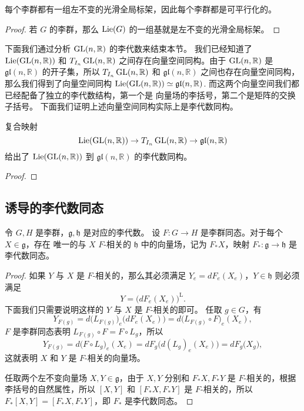 \begin{corollary}
  每个李群都有一组左不变的光滑全局标架，因此每个李群都是可平行化的。
\end{corollary}
\begin{proof}
  若 $G$ 的李群，那么 $\operatorname{Lie}(G)$ 的一组基就是左不变的光滑全局标架。
\end{proof}

下面我们通过分析 $\operatorname{GL}(n,\mathbb{R})$ 的李代数来结束本节。
我们已经知道了 $\operatorname{Lie}(\operatorname{GL}(n,\mathbb{R}))$ 和 $T_{I_n}\operatorname{GL}(n,\mathbb{R})$
之间存在向量空间同构。由于 $\operatorname{GL}(n,\mathbb{R})$ 是 $\mathfrak{gl}(n,\mathbb{R})$
的开子集，所以 $T_{I_n}\operatorname{GL}(n,\mathbb{R})$ 和 $\mathfrak{gl}(n,\mathbb{R})$
之间也存在向量空间同构，那么我们得到了向量空间同构
$\operatorname{Lie}(\operatorname{GL}(n,\mathbb{R}))\simeq \mathfrak{gl}(n,\mathbb{R})$.
而这两个向量空间我们都已经配备了独立的李代数结构，第一个是
向量场的李括号，第二个是矩阵的交换子括号。
下面我们证明上述向量空间同构实际上是李代数同构。

\begin{proposition}[一般线性群的李代数]
  复合映射
  \[
    \operatorname{Lie}(\operatorname{GL}(n,\mathbb{R}))\to T_{I_n}\operatorname{GL}(n,\mathbb{R})
    \to \mathfrak{gl}(n,\mathbb{R})  
  \]
  给出了 $\operatorname{Lie}(\operatorname{GL}(n,\mathbb{R}))$ 到 $\mathfrak{gl}(n,\mathbb{R})$
  的李代数同构。
\end{proposition}
\begin{proof}
  
\end{proof}

\subsection{诱导的李代数同态}

\begin{theorem}[李群同态诱导李代数同态]
  令 $G,H$ 是李群，$\mathfrak{g},\mathfrak{h}$ 是对应的李代数。
  设 $F:G\to H$ 是李群同态。对于每个 $X\in \mathfrak{g}$，存在
  唯一的与 $X$ $F$-相关的 $\mathfrak{h}$ 中的向量场，记为
  $F_*X$，映射 $F_*:\mathfrak{g}\to \mathfrak{h}$ 是李代数同态。
\end{theorem}
\begin{proof}
  如果 $Y$ 与 $X$ 是 $F$-相关的，那么其必须满足
  $Y_e=dF_e(X_e)$，$Y\in \mathfrak{h}$ 则必须满足
  \[
    Y=  \bigl(dF_e(X_e)\bigr)^{\mathrm{L}}.
  \]
  下面我们只需要说明这样的 $Y$ 与 $X$ 是 $F$-相关的即可。
  任取 $g\in G$，有
  \[
    Y_{F(g)}=d\bigl(L_{F(g)}\bigr)_{e}\bigl(dF_e(X_e)\bigr)=d\bigl(L_{F(g)}\circ F\bigr)_e
    (X_e),
  \]
  $F$ 是李群同态表明 $L_{F(g)}\circ F=F\circ L_g$，所以
  \[
    Y_{F(g)}=d\bigl(F\circ L_g\bigr)_e(X_e)=dF_g\bigl(d(L_g)_e(X_e )\bigr)
    =dF_g\bigl(X_g\bigr),
  \]
  这就表明 $X$ 和 $Y$ 是 $F$-相关的向量场。

  任取两个左不变向量场 $X,Y\in \mathfrak{g}$，由于 $X,Y$ 分别和 $F_*X,F_*Y$ 
  是 $F$-相关的，根据李括号的自然属性，所以 $[X,Y]$ 和 $[F_*X,F_*Y]$
  是 $F$-相关的，所以 $F_*[X,Y]=[F_*X,F_*Y]$，即 $F_*$ 是李代数同态。
\end{proof}

